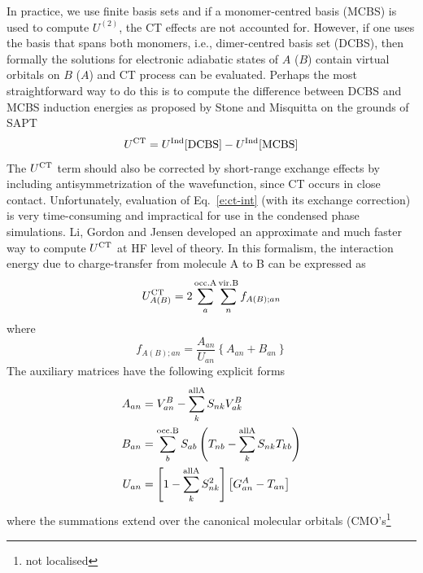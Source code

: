 \documentclass[b5paper,oneside,fleqn,11pt]{book}
\begin{document}
\begin{refsection}
In practice, 
we use finite basis sets and if a monomer\hyp{}centred basis (MCBS)
is used to compute $U^{(2)}$, the CT effects are not accounted for.
However, if one uses the basis that spans both monomers, i.e., 
dimer\hyp{}centred basis set (DCBS), then
formally the solutions for electronic adiabatic states of $A$ ($B$) contain
virtual orbitals on $B$ ($A$) and CT process can be evaluated.
Perhaps the most straightforward way to do this is to compute
the difference between DCBS and MCBS induction energies as proposed 
by Stone and Misquitta \citep{Stone.Misquitta.CPL.2009}
on the grounds of SAPT \citep{Jeziorski.Moszynski.Szalewicz.ChemRev.1994}
%
\begin{equation} \label{e:ct-int}
 U^{\rm CT} = U^{\rm Ind}[{\rm DCBS}] - U^{\rm Ind}[{\rm MCBS}]
\end{equation}
%
The $U^{\rm CT}$ term should also be corrected by short\hyp{}range
exchange effects by including antisymmetrization of the
wavefunction, \citep{Stone.Misquitta.CPL.2009} since CT occurs 
in close contact.
Unfortunately, evaluation of Eq.~\eqref{e:ct-int} (with its 
exchange correction) is very
time\hyp{}consuming and impractical for use in the condensed
phase simulations. Li, Gordon and Jensen developed
an approximate and much faster way to compute $U^{\rm CT}$
at HF level of theory. \citep{Li.Gordon.Jensen.JCP.2006}
In this formalism, the interaction energy due to charge\hyp{}transfer
from molecule A to B
can be expressed as
%
\begin{equation}  \label{e:ct-int-efp}
 U^{\rm CT}_{A(B)} = 2\sum_a^{\rm occ. A} \sum_n^{\rm vir. B} f_{A(B);an}
\end{equation}
%
where
%
\begin{equation}  
  f_{A(B);an} = \frac{A_{an}}{U_{an}} \left\{ A_{an} + B_{an} \right\}
\end{equation}
%
The auxiliary matrices have the following explicit forms
%
\begin{subequations}  
\begin{align}
 A_{an}  &= V_{an}^{B} - \sum_k^{\rm all A} S_{nk} V_{ak}^B \\
 B_{an}  &= \sum_b^{\rm occ. B} S_{ab} \left( 
         T_{nb} - \sum_k^{\rm all A} S_{nk} T_{kb}
     \right) \\
 U_{an}  &= \left[1 - \sum_k^{\rm all A} S_{nk}^2 \right] 
            \left[ G^A_{an} - T_{an}\right]
\end{align}
\end{subequations}
%
where the summations extend over the canonical molecular orbitals (CMO's\footnote{not localised
}
\end{refsection}
\end{document}
